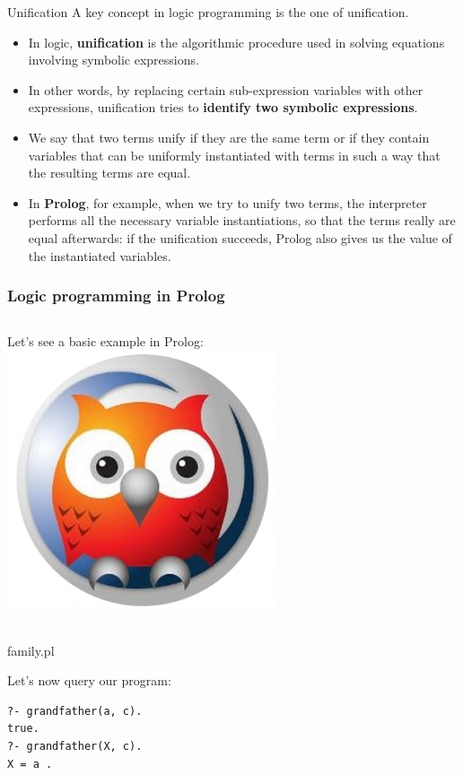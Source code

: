 \begin{frame}{Unification}
A key concept in logic programming is the one of unification.\\
\begin{itemize}
\item In logic, \textbf{unification} is the algorithmic procedure used in solving equations involving symbolic expressions. \\
\item In other words, by replacing certain sub-expression variables with other expressions, unification tries to \textbf{identify two symbolic expressions}.\\
\item We say that two terms unify if they are the same term or if they contain variables that can be uniformly instantiated with terms in such a way that the resulting terms are equal. \\
\item In \textbf{Prolog}, for example, when we try to unify two terms, the interpreter performs all the necessary variable instantiations, so that the terms really are equal afterwards: if the unification succeeds, Prolog also gives us the value of the instantiated variables.
\end{itemize}
\end{frame}

\begin{frame}[fragile]
\frametitle{Logic programming in Prolog}
\begin{columns}
        	Let's see a basic example in Prolog:
			\includegraphics[scale=0.15]{img/logo_swipl.png}
	\end{columns}


\begin{exampleblock}{family.pl}
    
\end{exampleblock}

Let's now query our program:\\

\begin{lstlisting}
?- grandfather(a, c).
true.
?- grandfather(X, c).
X = a .
\end{lstlisting}

\end{frame}

